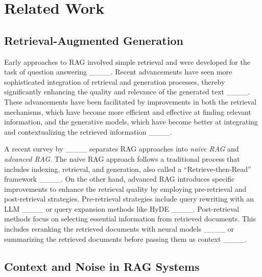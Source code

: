 \section{Related Work}
\subsection{Retrieval-Augmented Generation}
Early approaches to RAG involved simple retrieval and were developed for the task of question answering ____. Recent advancements have seen more sophisticated integration of retrieval and generation processes, thereby significantly enhancing the quality and relevance of the generated text ____.
These advancements have been facilitated by improvements in both the retrieval mechanisms, which have become more efficient and effective at finding relevant information, and the generative models, which have become better at integrating and contextualizing the retrieved information ____.

A recent survey by ____ separates RAG approaches into \textit{naive RAG} and \textit{advanced RAG}. The naive RAG approach follows a traditional process that includes indexing, retrieval, and generation, also called a “Retrieve-then-Read” framework ____. 
On the other hand, advanced RAG introduces specific improvements to enhance the retrieval quality by employing pre-retrieval and post-retrieval strategies. Pre-retrieval strategies include query rewriting with an LLM ____ or query expansion methods like HyDE ____.
Post-retrieval methods focus on selecting essential information from retrieved documents. This includes reranking the retrieved documents with neural models ____ or summarizing the retrieved documents before passing them as context ____. 


\subsection{Context and Noise in RAG Systems}

